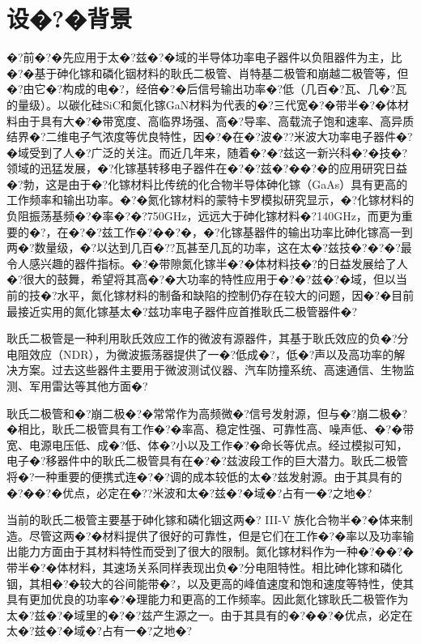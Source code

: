 \documentclass{zjureport}
\begin{document}
\newpage
\setcounter{page}{0}
\thispagestyle{empty}
\tableofcontents


\newpage
\section{设�?�背景}
	�?前�?�先应用于太�?兹�?�域的半导体功率电子器件以负阻器件为主，比�?�基于砷化镓和磷化铟材料的耿氏二极管、肖特基二极管和崩越二极管等，但�?由它�?构成的电�?，经倍�?�后信号输出功率�?低（几百�?瓦、几�?瓦的量级）。以碳化硅SiC和氮化镓GaN材料为代表的�?三代宽�?�带半�?�体材料由于具有大�?�带宽度、高临界场强、高�?导率、高载流子饱和速率、高异质结界�?二维电子气浓度等优良特性，因�?�在�?波�??米波大功率电子器件�?�域受到了人�?广泛的关注。而近几年来，随着�?�?兹这一新兴科�?�技�?领域的迅猛发展，�?化镓基转移电子器件在�?�?兹�?��?�的应用研究日益�?勃，这是由于�?化镓材料比传统的化合物半导体砷化镓（GaAs）具有更高的工作频率和输出功率。�?�氮化镓材料的蒙特卡罗模拟研究显示，�?化镓材料的负阻振荡基频�?�率�?�?750GHz，远远大于砷化镓材料�?140GHz，而更为重要的�?，在�?�?兹工作�?��?�，�?化镓基器件的输出功率比砷化镓高一到两�?数量级，�?以达到几百�??瓦甚至几瓦的功率，这在太�?兹技�?�?�?最令人感兴趣的器件指标。�?�带隙氮化镓半�?�体材料技�?的日益发展给了人�?很大的鼓舞，希望将其高�?�大功率的特性应用于�?�?兹�?�域，但以当前的技�?水平，氮化镓材料的制备和缺陷的控制仍存在较大的问题，因�?�目前最接近实用的氮化镓基太�?兹功率电子器件应首推耿氏二极管器件�?
	
	耿氏二极管是一种利用耿氏效应工作的微波有源器件，其基于耿氏效应的负�?分电阻效应（NDR），为微波振荡器提供了一�?低成�?，低�?声以及高功率的解决方案。过去这些器件主要用于微波测试仪器、汽车防撞系统、高速通信、生物监测、军用雷达等其他方面�?
	
	耿氏二极管和�?崩二极�?�常常作为高频微�?信号发射源，但与�?崩二极�?�相比，耿氏二极管具有工作�?�率高、稳定性强、可靠性高、噪声低、�?�带宽、电源电压低、成�?低、体�?小以及工作�?�命长等优点。经过模拟可知，电子�?移器件中的耿氏二极管具有在�?�?兹波段工作的巨大潜力。耿氏二极管将�?一种重要的便携式连�?�?调的成本较低的太�?兹发射源。由于其具有的�?��?�优点，必定在�??米波和太�?兹�?�域�?占有一�?之地�?
	
	当前的耿氏二极管主要基于砷化镓和磷化铟这两�? III-V 族化合物半�?�体来制造。尽管这两�?�材料提供了很好的可靠性，但是它们在工作�?�率以及功率输出能力方面由于其材料特性而受到了很大的限制。氮化镓材料作为一种�?��?�带半�?�体材料，其速场关系同样表现出负�?分电阻特性。相比砷化镓和磷化铟，其相�?�较大的谷间能带�?，以及更高的峰值速度和饱和速度等特性，使其具有更加优良的功率�?�理能力和更高的工作频率。因此氮化镓耿氏二极管作为太�?兹�?�域里的�?�?兹产生源之一。由于其具有的�?��?�优点，必定在太�?兹�?�域�?占有一�?之地�?
	
\end{document}

